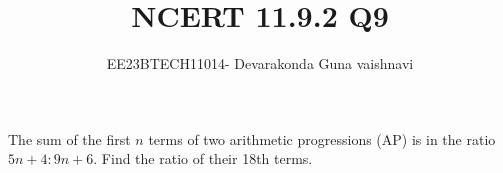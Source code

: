 \documentclass[12pt]{article}
\title{NCERT 11.9.2  Q9}
\author{EE23BTECH11014- Devarakonda Guna vaishnavi}
\begin{document}
\maketitle

The sum of the first $n$ terms of two arithmetic progressions (AP) is in the ratio $5n+4 : 9n+6$. Find the ratio of their 18th terms.
\end{document}
